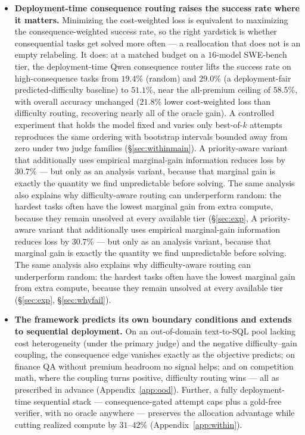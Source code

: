 \documentclass{article}
\begin{document}
\begin{itemize}
\item[(4)] \textbf{Deployment-time consequence routing raises the
success rate where it matters.} Minimizing the cost-weighted loss is
equivalent to maximizing the consequence-weighted success rate, so the
right yardstick is whether consequential tasks get solved more often
--- a reallocation that does not is an empty relabeling. It does: at a
matched budget on a $16$-model SWE-bench tier, the deployment-time Qwen
consequence router lifts the success rate on high-consequence tasks
from $19.4\%$ (random) and $29.0\%$ (a deployment-fair
predicted-difficulty baseline) to $51.1\%$, near the all-premium
ceiling of $58.5\%$, with overall accuracy unchanged ($21.8\%$ lower
cost-weighted loss than difficulty routing, recovering nearly all of
the oracle gain). A controlled experiment that holds the model fixed
and varies only best-of-$k$ attempts reproduces the same ordering with
bootstrap intervals bounded away from zero under two judge families
(\S\ref{sec:withinmain}). A priority-aware
variant that additionally uses empirical marginal-gain information
reduces loss by $30.7\%$ --- but only as an analysis variant, because
that marginal gain is exactly the quantity we find unpredictable before
solving. The same analysis also explains why
difficulty-aware routing can underperform random: the hardest tasks
often have the lowest marginal gain from extra compute, because they
remain unsolved at every available tier (\S\ref{sec:exp}, A priority-aware
variant that additionally uses empirical marginal-gain information
reduces loss by $30.7\%$ --- but only as an analysis variant, because
that marginal gain is exactly the quantity we find unpredictable before
solving. The same analysis also explains why
difficulty-aware routing can underperform random: the hardest tasks
often have the lowest marginal gain from extra compute, because they
remain unsolved at every available tier (\S\ref{sec:exp},
\S\ref{sec:whyfail}).

\item[(5)] \textbf{The framework predicts its own boundary
conditions and extends to sequential deployment.} On an
out-of-domain text-to-SQL pool lacking cost heterogeneity (under
the primary judge) and the negative difficulty--gain coupling, the
consequence edge vanishes exactly as the objective predicts; on
finance QA without premium headroom no signal helps; and on
competition math, where the coupling turns positive, difficulty
routing wins --- all as prescribed in advance
(Appendix~\ref{app:ood}). Further, a
fully deployment-time sequential stack --- consequence-gated attempt
caps plus a gold-free verifier, with no oracle anywhere --- preserves
the allocation advantage while cutting realized compute by
$31$--$42\%$ (Appendix~\ref{app:within}).

\end{itemize}
\end{document}
